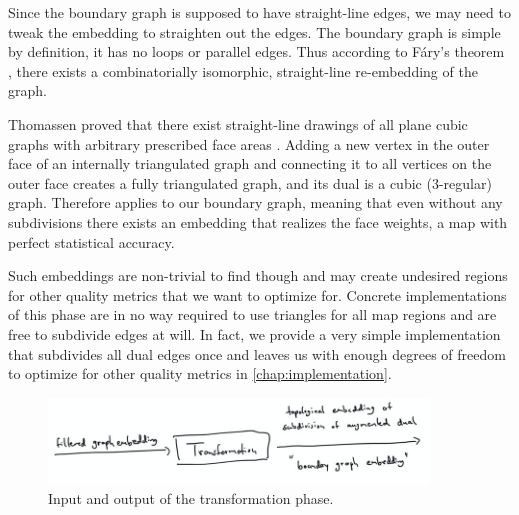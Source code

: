 Since the boundary graph is supposed to have straight-line edges, we may need to tweak the embedding to straighten out the edges. The boundary graph is simple by definition, \ie{} it has no loops or parallel edges. Thus according to Fáry's theorem \cite{fary1948straight}, there exists a combinatorially isomorphic, straight-line re-embedding of the graph.

Thomassen proved that there exist straight-line drawings of all plane cubic graphs with arbitrary prescribed face areas \cite{thomassen1992plane}. Adding a new vertex in the outer face of an internally triangulated graph and connecting it to all vertices on the outer face creates a fully triangulated graph, and its dual is a cubic (3-regular) graph. Therefore \cite{thomassen1992plane} applies to our boundary graph, meaning that even without any subdivisions there exists an embedding that realizes the face weights, \ie{} a map with perfect statistical accuracy.

Such embeddings are non-trivial to find though and may create undesired regions for other quality metrics that we want to optimize for. Concrete implementations of this phase are in no way required to use triangles for all map regions and are free to subdivide edges at will. In fact, we provide a very simple implementation that subdivides all dual edges once and leaves us with enough degrees of freedom to optimize for other quality metrics in \cref{chap:implementation}.

\begin{figure}[H]
	\centering\includegraphics[width=0.9\textwidth]{Resources/Pipeline-Transformation.png}
	\caption{Input and output of the transformation phase.}
	\label{fig:pipeline-transformation}
\end{figure}
